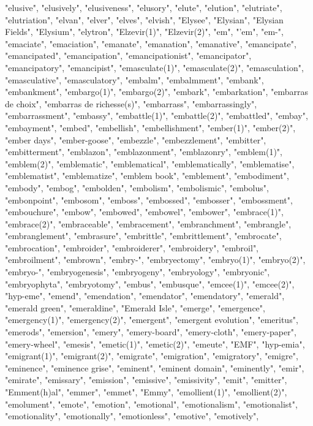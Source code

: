 "elusive",
"elusively",
"elusiveness",
"elusory",
"elute",
"elution",
"elutriate",
"elutriation",
"elvan",
"elver",
"elves",
"elvish",
"Elysee",
"Elysian",
"Elysian Fields",
"Elysium",
"elytron",
"Elzevir(1)",
"Elzevir(2)",
"em",
"'em",
"em-",
"emaciate",
"emaciation",
"emanate",
"emanation",
"emanative",
"emancipate",
"emancipated",
"emancipation",
"emancipationist",
"emancipator",
"emancipatory",
"emancipist",
"emasculate(1)",
"emasculate(2)",
"emasculation",
"emasculative",
"emasculatory",
"embalm",
"embalmment",
"embank",
"embankment",
"embargo(1)",
"embargo(2)",
"embark",
"embarkation",
"embarras de choix",
"embarras de richesse(s)",
"embarrass",
"embarrassingly",
"embarrassment",
"embassy",
"embattle(1)",
"embattle(2)",
"embattled",
"embay",
"embayment",
"embed",
"embellish",
"embellishment",
"ember(1)",
"ember(2)",
"ember days",
"ember-goose",
"embezzle",
"embezzlement",
"embitter",
"embitterment",
"emblazon",
"emblazonment",
"emblazonry",
"emblem(1)",
"emblem(2)",
"emblematic",
"emblematical",
"emblematically",
"emblematise",
"emblematist",
"emblematize",
"emblem book",
"emblement",
"embodiment",
"embody",
"embog",
"embolden",
"embolism",
"embolismic",
"embolus",
"embonpoint",
"embosom",
"emboss",
"embossed",
"embosser",
"embossment",
"embouchure",
"embow",
"embowed",
"embowel",
"embower",
"embrace(1)",
"embrace(2)",
"embraceable",
"embracement",
"embranchment",
"embrangle",
"embranglement",
"embrasure",
"embrittle",
"embrittlement",
"embrocate",
"embrocation",
"embroider",
"embroiderer",
"embroidery",
"embroil",
"embroilment",
"embrown",
"embry-",
"embryectomy",
"embryo(1)",
"embryo(2)",
"embryo-",
"embryogenesis",
"embryogeny",
"embryology",
"embryonic",
"embryophyta",
"embryotomy",
"embus",
"embusque",
"emcee(1)",
"emcee(2)",
"hyp-eme",
"emend",
"emendation",
"emendator",
"emendatory",
"emerald",
"emerald green",
"emeraldine",
"Emerald Isle",
"emerge",
"emergence",
"emergency(1)",
"emergency(2)",
"emergent",
"emergent evolution",
"emeritus",
"emerods",
"emersion",
"emery",
"emery-board",
"emery-cloth",
"emery-paper",
"emery-wheel",
"emesis",
"emetic(1)",
"emetic(2)",
"emeute",
"EMF",
"hyp-emia",
"emigrant(1)",
"emigrant(2)",
"emigrate",
"emigration",
"emigratory",
"emigre",
"eminence",
"eminence grise",
"eminent",
"eminent domain",
"eminently",
"emir",
"emirate",
"emissary",
"emission",
"emissive",
"emissivity",
"emit",
"emitter",
"Emment(h)al",
"emmer",
"emmet",
"Emmy",
"emollient(1)",
"emollient(2)",
"emolument",
"emote",
"emotion",
"emotional",
"emotionalism",
"emotionalist",
"emotionality",
"emotionally",
"emotionless",
"emotive",
"emotively",
